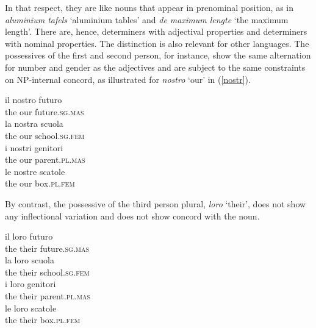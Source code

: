 \documentclass[output=paper
	        ,collection
	        ,collectionchapter
 	        ,biblatex
                ,babelshorthands
                ,newtxmath
                ,draftmode
                ,colorlinks, citecolor=brown
]{langscibook}
\begin{document}
\noindent
In that respect, they are like nouns that appear in prenominal position,
as in \emph{aluminium tafels} `aluminium tables' and \emph{de maximum lengte}
`the maximum length'. There are, hence, determiners with adjectival 
properties and determiners with nominal properties.   
The distinction is also relevant for other languages. The  
possessives of the first and second person, for instance, 
show the same alternation for number and gender as the adjectives
and are subject to the same constraints on NP-internal concord, as illustrated 
for \emph{nostro} `our' in (\ref{nostr}). 

\begin{exe}  
\ex\label{nostr} 
\begin{xlist}
\ex 
\gll  il nostro futuro \\
      the our future.\textsc{sg.mas} \\ 
\ex 
\gll  la nostra scuola  \\
      the our school.\textsc{sg.fem} \\ 
\ex 
\gll  i nostri genitori \\
      the our parent.\textsc{pl.mas} \\ 
\ex 
\gll  le nostre scatole \\
      the our box.\textsc{pl.fem} \\ 
\end{xlist}
\end{exe} 

\noindent
By contrast, the possessive of the third person plural, \emph{loro} `their',
does not show any inflectional variation and does not show concord with the noun.

\begin{exe} 
\ex 
\begin{xlist}
\ex 
\gll  il loro futuro \\   
      the their future.\textsc{sg.mas}  \\ 
\ex 
\gll  la loro scuola  \\   
      the their school.\textsc{sg.fem}   \\ 
\ex 
\gll  i loro genitori \\   
      the their parent.\textsc{pl.mas} \\ 
\ex 
\gll  le loro scatole \\   
      the their box.\textsc{pl.fem} \\ 
\end{xlist} 
\end{exe}
\end{document}
